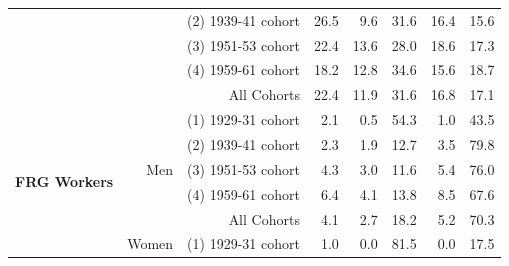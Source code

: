 \begin{Article}
\begin{refsection}[Spitz]
\begin{landscape}
\begin{table}[]
{\begin{tabular}{lll*5{r}}
\multicolumn{1}{r}{} & \multicolumn{1}{r}{} & \multicolumn{1}{r}{(2) 1939-41 cohort} & \multicolumn{1}{r}{26.5} & \multicolumn{1}{r}{9.6} & \multicolumn{1}{r}{31.6} & \multicolumn{1}{r}{16.4} & 15.6 \\ \cline{3-8} 
\multicolumn{1}{r}{} & \multicolumn{1}{r}{} & \multicolumn{1}{r}{(3) 1951-53 cohort} & \multicolumn{1}{r}{22.4} & \multicolumn{1}{r}{13.6} & \multicolumn{1}{r}{28.0} & \multicolumn{1}{r}{18.6} & 17.3 \\ \cline{3-8} 
\multicolumn{1}{r}{} & \multicolumn{1}{r}{} & \multicolumn{1}{r}{(4) 1959-61 cohort} & \multicolumn{1}{r}{18.2} & \multicolumn{1}{r}{12.8} & \multicolumn{1}{r}{34.6} & \multicolumn{1}{r}{15.6} & 18.7 \\ \cline{3-8} 
\multicolumn{1}{r}{} & \multicolumn{1}{r}{} & \multicolumn{1}{r}{All Cohorts} & \multicolumn{1}{r}{22.4} & \multicolumn{1}{r}{11.9} & \multicolumn{1}{r}{31.6} & \multicolumn{1}{r}{16.8} & 17.1 \\ \hline
\multicolumn{1}{r}{\multirow{10}{*}{\textbf{FRG Workers}}} & \multicolumn{1}{r}{\multirow{5}{*}{Men}} & \multicolumn{1}{r}{(1) 1929-31 cohort} & \multicolumn{1}{r}{2.1} & \multicolumn{1}{r}{0.5} & \multicolumn{1}{r}{54.3} & \multicolumn{1}{r}{1.0} & 43.5 \\ \cline{3-8} 
\multicolumn{1}{r}{} & \multicolumn{1}{r}{} & \multicolumn{1}{r}{(2) 1939-41 cohort} & \multicolumn{1}{r}{2.3} & \multicolumn{1}{r}{1.9} & \multicolumn{1}{r}{12.7} & \multicolumn{1}{r}{3.5} & 79.8 \\ \cline{3-8} 
\multicolumn{1}{r}{} & \multicolumn{1}{r}{} & \multicolumn{1}{r}{(3) 1951-53 cohort} & \multicolumn{1}{r}{4.3} & \multicolumn{1}{r}{3.0} & \multicolumn{1}{r}{11.6} & \multicolumn{1}{r}{5.4} & 76.0 \\ \cline{3-8} 
\multicolumn{1}{r}{} & \multicolumn{1}{r}{} & \multicolumn{1}{r}{(4) 1959-61 cohort} & \multicolumn{1}{r}{6.4} & \multicolumn{1}{r}{4.1} & \multicolumn{1}{r}{13.8} & \multicolumn{1}{r}{8.5} & 67.6 \\ \cline{3-8} 
\multicolumn{1}{r}{} & \multicolumn{1}{r}{} & \multicolumn{1}{r}{All Cohorts} & \multicolumn{1}{r}{4.1} & \multicolumn{1}{r}{2.7} & \multicolumn{1}{r}{18.2} & \multicolumn{1}{r}{5.2} & 70.3 \\ \cline{2-8} 
\multicolumn{1}{r}{} & \multicolumn{1}{r}{\multirow{5}{*}{Women}} & \multicolumn{1}{r}{(1) 1929-31 cohort} & \multicolumn{1}{r}{1.0} & \multicolumn{1}{r}{0.0} & \multicolumn{1}{r}{81.5} & \multicolumn{1}{r}{0.0} & 17.5 \\ \cline{3-8} 

\end{tabular}}
\end{table}
\end{landscape}
\end{refsection}
\end{Article}
